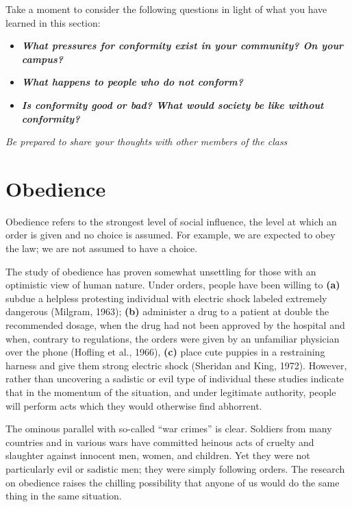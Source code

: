 \documentclass[
]{book}
\providecommand{\tightlist}{%
  \setlength{\itemsep}{0pt}\setlength{\parskip}{0pt}}
\begin{document}
\begin{reflect}
Take a moment to consider the following questions in light of what you have learned in this section:

\begin{itemize}
\tightlist
\item
  \textbf{\emph{What pressures for conformity exist in your community? On your campus?}}\\
\item
  \textbf{\emph{What happens to people who do not conform?}}\\
\item
  \textbf{\emph{Is conformity good or bad? What would society be like without conformity?}}
\end{itemize}

\emph{Be prepared to share your thoughts with other members of the class}
\end{reflect}

\hypertarget{obedience}{%
\section{Obedience}\label{obedience}}

Obedience refers to the strongest level of social influence, the level at which an order is given and no choice is assumed. For example, we are expected to obey the law; we are not assumed to have a choice.

The study of obedience has proven somewhat unsettling for those with an optimistic view of human nature. Under orders, people have been willing to \textbf{(a)} subdue a helpless protesting individual with electric shock labeled extremely dangerous (Milgram, 1963); \textbf{(b)} administer a drug to a patient at double the recommended dosage, when the drug had not been approved by the hospital and when, contrary to regulations, the orders were given by an unfamiliar physician over the phone (Hofling et al., 1966), \textbf{(c)} place cute puppies in a restraining harness and give them strong electric shock (Sheridan and King, 1972). However, rather than uncovering a sadistic or evil type of individual these studies indicate that in the momentum of the situation, and under legitimate authority, people will perform acts which they would otherwise find abhorrent.

The ominous parallel with so-called ``war crimes'' is clear. Soldiers from many countries and in various wars have committed heinous acts of cruelty and slaughter against innocent men, women, and children. Yet they were not particularly evil or sadistic men; they were simply following orders. The research on obedience raises the chilling possibility that anyone of us would do the same thing in the same situation.
\end{document}
